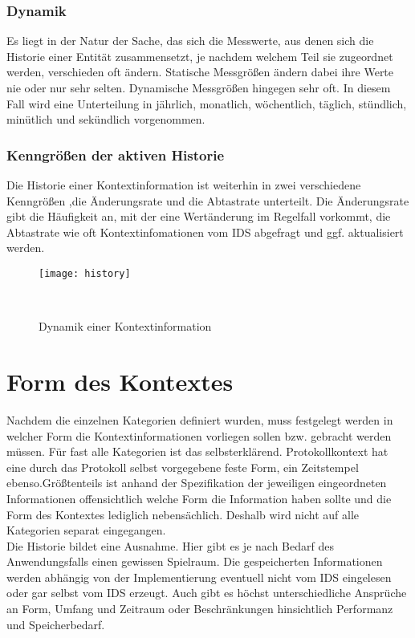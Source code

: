 \subsubsection{Dynamik}
\label{subsub:dyn}
Es liegt in der Natur der Sache, das sich die Messwerte, aus denen sich die Historie einer Entität zusammensetzt, je nachdem welchem Teil sie zugeordnet werden, verschieden oft ändern.
Statische Messgrößen ändern dabei ihre Werte nie oder nur sehr selten. Dynamische Messgrößen hingegen sehr oft. In diesem Fall wird eine Unterteilung in jährlich, monatlich, wöchentlich, täglich, stündlich, minütlich und sekündlich vorgenommen. 
\subsubsection{Kenngrößen der aktiven Historie}
\label{subsub:his_val}
Die Historie einer Kontextinformation ist weiterhin in zwei verschiedene Kenngrößen ,die Änderungsrate und die Abtastrate unterteilt. Die Änderungsrate gibt die Häufigkeit an, mit der eine Wertänderung im Regelfall vorkommt, die Abtastrate wie oft Kontextinfomationen vom IDS abgefragt und ggf. aktualisiert werden.
\begin{figure}[H]
\centering
\label{history_graph}
\texttt{[image: history]}
\caption{Dynamik einer Kontextinformation}
\
\end{figure}
\section{Form des Kontextes}
Nachdem die einzelnen Kategorien definiert wurden, muss festgelegt werden in welcher Form die Kontextinformationen vorliegen sollen bzw. gebracht werden müssen. Für fast alle Kategorien ist das selbsterklärend. Protokollkontext hat eine durch das Protokoll selbst vorgegebene feste Form, ein Zeitstempel ebenso.Größtenteils ist anhand der Spezifikation der jeweiligen eingeordneten Informationen offensichtlich welche Form die Information haben sollte und die Form des Kontextes lediglich nebensächlich. Deshalb wird nicht auf alle Kategorien separat eingegangen.\\
Die Historie bildet eine Ausnahme. Hier gibt es je nach Bedarf des Anwendungsfalls einen gewissen Spielraum. Die gespeicherten Informationen werden abhängig von der Implementierung eventuell nicht vom IDS eingelesen oder gar selbst vom IDS erzeugt. Auch gibt es höchst unterschiedliche Ansprüche an Form, Umfang und Zeitraum oder Beschränkungen hinsichtlich Performanz und Speicherbedarf.
